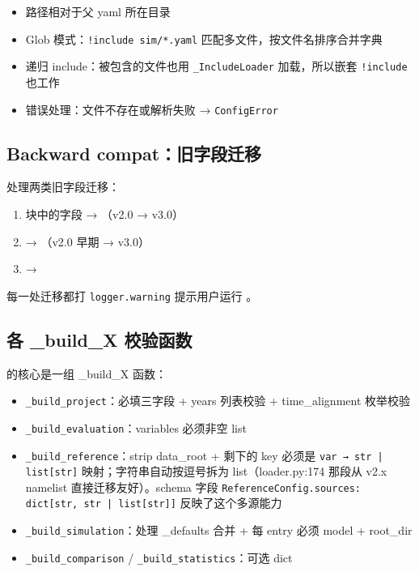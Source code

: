 \begin{itemize}
  \item 路径相对于父 yaml 所在目录
  \item Glob 模式：\texttt{!include sim/*.yaml} 匹配多文件，按文件名排序合并字典
  \item 递归 include：被包含的文件也用 \texttt{\_IncludeLoader} 加载，所以嵌套 \texttt{!include} 也工作
  \item 错误处理：文件不存在或解析失败 → \texttt{ConfigError}
\end{itemize}

\subsection{Backward compat：旧字段迁移}

 处理两类旧字段迁移：

\begin{enumerate}
  \item {} 块中的字段 → （v2.0 → v3.0）
  \item {} → （v2.0 早期 → v3.0）
  \item {} → 
\end{enumerate}

每一处迁移都打 \texttt{logger.warning} 提示用户运行 。

\subsection{各 \_build\_X 校验函数}

 的核心是一组 \_build\_X 函数：

\begin{itemize}
  \item \texttt{\_build\_project}：必填三字段 + years 列表校验 + time\_alignment 枚举校验
  \item \texttt{\_build\_evaluation}：variables 必须非空 list
  \item \texttt{\_build\_reference}：strip data\_root + 剩下的 key 必须是 \texttt{var → str | list[str]} 映射；字符串自动按逗号拆为 list（loader.py:174 那段从 v2.x namelist 直接迁移友好）。schema 字段 \texttt{ReferenceConfig.sources: dict[str, str | list[str]]} 反映了这个多源能力
  \item \texttt{\_build\_simulation}：处理 \_defaults 合并 + 每 entry 必须 model + root\_dir
  \item \texttt{\_build\_comparison} / \texttt{\_build\_statistics}：可选 dict
\end{itemize}

